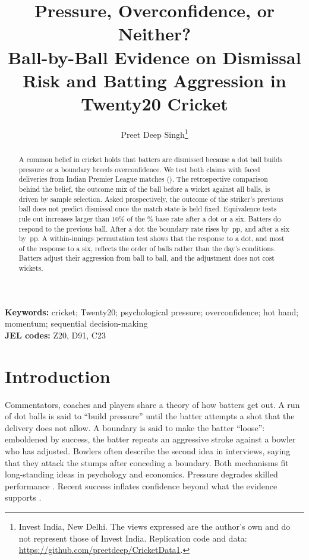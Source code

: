 \documentclass[11pt]{article}
\title{\textbf{Pressure, Overconfidence, or Neither?\\ Ball-by-Ball Evidence on Dismissal Risk and Batting Aggression in Twenty20 Cricket}}
\author{Preet Deep Singh\thanks{Invest India, New Delhi. The views expressed are the author's own and do not represent those of Invest India. Replication code and data: \url{https://github.com/preetdeep/CricketData1}.}}
\date{}
\newcommand{\pp}{\,pp}
\begin{document}
\maketitle

\begin{abstract}
\noindent A common belief in cricket holds that batters are dismissed because a dot ball builds pressure or a boundary breeds overconfidence. We test both claims with \FacedDeliveries{} faced deliveries from \Matches{} Indian Premier League matches (\Seasons). The retrospective comparison behind the belief, the outcome mix of the ball before a wicket against all balls, is driven by sample selection. Asked prospectively, the outcome of the striker's previous ball does not predict dismissal once the match state is held fixed. Equivalence tests rule out increases larger than 10\% of the \BaseRate\% base rate after a dot or a six. Batters do respond to the previous ball. After a dot the boundary rate rises by \MBoundaryDot\pp{}, and after a six by \MBoundarySix\pp{}. A within-innings permutation test shows that the response to a dot, and most of the response to a six, reflects the order of balls rather than the day's conditions. Batters adjust their aggression from ball to ball, and the adjustment does not cost wickets.
\end{abstract}

\medskip
\noindent\textbf{Keywords:} cricket; Twenty20; psychological pressure; overconfidence; hot hand; momentum; sequential decision-making\\
\noindent\textbf{JEL codes:} Z20, D91, C23

\newpage

\section{Introduction}

Commentators, coaches and players share a theory of how batters get out. A run of dot balls is said to ``build pressure'' until the batter attempts a shot that the delivery does not allow. A boundary is said to make the batter ``loose'': emboldened by success, the batter repeats an aggressive stroke against a bowler who has adjusted. Bowlers often describe the second idea in interviews, saying that they attack the stumps after conceding a boundary. Both mechanisms fit long-standing ideas in psychology and economics. Pressure degrades skilled performance \citep{baumeister1984choking,beilock2001fragility}. Recent success inflates confidence beyond what the evidence supports \citep{moore2008trouble}.
\end{document}
